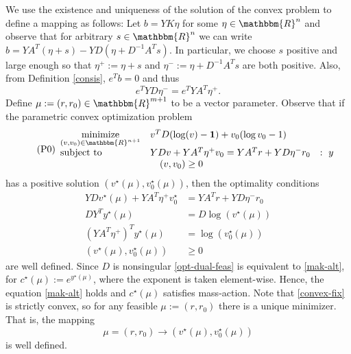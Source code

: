 \documentclass[smallextended]{svjour3}       %
\newcommand*{\0}{\mathbf{0}}
\newcommand*{\1}{\mathbf{1}}
\newcommand*{\minimize}{\text{minimize}}
\newcommand*{\st}{\text{subject to}}
\newcommand*{\R}{\mathbbm{R}}
\begin{document}
We use the existence and uniqueness of the solution of the convex problem 
to define a mapping as follows: Let $b=YK\eta$ for some $\eta \in \R^n$ and observe
that for arbitrary $s \in \R^n$ we can write $b = YA^T(\eta +s) - YD(\eta +
D^{-1}A^Ts)$.  In particular, we choose $s$ positive and large enough so
that $\eta^+ := \eta+s$ and $\eta^- := \eta + D^{-1}A^Ts$ are both positive.
Also, from Definition \ref{consis}, $e^Tb = 0$ and thus
\begin{equation}
  e^TYD\eta^- = e^TYA^T\eta^+.
  \label{massbalanceb}
\end{equation}
Define $\mu:=(r,r_0) \in \R^{m+1}$ to be a vector parameter.  Observe that if
the parametric convex optimization problem
\begin{equation}
  \tag{P0}
	\begin{array}{lll}
  \underset{(v,v_0)\in\R^{n+1}}{\minimize} & v^T D(\log(v)-\1) + v_0(\log v_0 -1) \\
	\st &  YD v + YA^T\eta^+ v_0 = YA^Tr + YD\eta^-r_0 &:\ y \\
	    &\quad (v,v_0) \ge 0                     
	\end{array}
	\label{convex-fix}
\end{equation}
has a positive solution $(v^\star(\mu),v_0^\star(\mu))$, then the optimality
conditions
\begin{subequations}
	\begin{align}
      YDv^\star(\mu)  + YA^T\eta^+ v^\star_0  &= YA^Tr + YD\eta^-r_0  \label{opt-primal-feas}\\
      DY^T y^\star(\mu) &= D\log(v^\star(\mu))                        \label{opt-dual-feas}\\
      (YA^T\eta^+)^Ty^\star(\mu)   &= \log(v^\star_0(\mu))            \label{opt-dual-feas-two}\\
    (v^\star(\mu),v_0^\star(\mu)) &\ge 0                              \label{opt-primal-bounds}
	\end{align}
    \label{opt-cond}
\end{subequations}
are well defined. Since $D$ is nonsingular \eqref{opt-dual-feas} is
equivalent to \eqref{mak-alt}, for $c^\star(\mu) := e^{y^\star(\mu)}$, where
the exponent is taken element-wise.  Hence, the equation \eqref{mak-alt} holds
and $c^\star(\mu)$ satisfies mass-action. Note that 
\eqref{convex-fix} is strictly convex, so for any feasible $\mu:=(r,r_0)$ there is 
a unique minimizer. That is, the mapping 
\begin{equation}
  \mu=(r,r_0) \rightarrow (v^\star(\mu),v^\star_0(\mu))
  \label{mapping}
\end{equation} 
is well defined.
\end{document}
